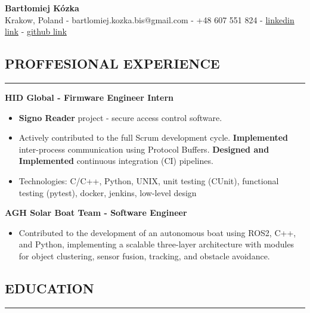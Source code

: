 \documentclass[9pt]{extarticle}
\begin{document}
\begin{center}
{\LARGE{\textbf{Bartłomiej Kózka}}} \\
\vspace{0.2cm}
Krakow, Poland - bartlomiej.kozka.bis@gmail.com - +48 607 551 824 - 
    \href{https://www.linkedin.com/in/bart%C5%82omiejkozka44/}{linkedin link} -
    \href{https://github.com/bartlomiejkozka}{github link}
\end{center}


\subsection*{PROFFESIONAL EXPERIENCE}
\vspace{-1.5em}
\rule{\textwidth}{0.1pt}
\vspace{-0.5em}

\noindent\textbf{HID Global - Firmware Engineer Intern}
\begin{itemize}[itemsep=-3pt, topsep=3pt]
    \item \textbf{Signo Reader} project - secure access control software.
    \item Actively contributed to the full Scrum development cycle. 
          \textbf{Implemented} inter-process communication using Protocol Buffers.
          \textbf{Designed and Implemented} continuous integration (CI) pipelines.
    \item Technologies: C/C++, Python, UNIX, unit testing (CUnit), functional testing (pytest), docker, jenkins, low-level design
\end{itemize}
\noindent\textbf{AGH Solar Boat Team - Software Engineer}
\begin{itemize}[itemsep=-3pt, topsep=3pt]
    \item Contributed to the development of an autonomous boat using ROS2, C++, and Python, implementing a scalable three-layer architecture with modules for object clustering, sensor fusion, tracking, and obstacle avoidance.
\end{itemize}


\subsection*{EDUCATION}
\vspace{-1.5em}
\rule{\textwidth}{0.1pt}
\vspace{-0.5em}
\end{document}
